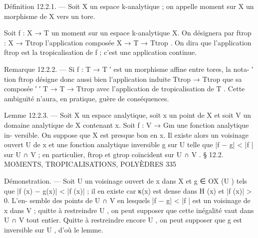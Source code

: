 \documentclass[
  10pt,
]{article}
\newenvironment{Shaded}{}{}
\newcommand{\NormalTok}[1]{#1}
\begin{document}
\begin{Shaded}
\begin{Highlighting}[]
\NormalTok{Définition 12.2.1. — Soit X un espace k{-}analytique ; on appelle moment sur X un}
\NormalTok{morphisme de X vers un tore.}

\NormalTok{   Soit f : X → T un moment sur un espace k{-}analytique X. On désignera par ftrop : X →}
\NormalTok{Ttrop l’application composée X → T → Ttrop . On dira que l’application ftrop est la}
\NormalTok{tropicalisation de f ; c’est une application continue.}

\NormalTok{Remarque 12.2.2. — Si f : T → T ′ est un morphisme affine entre tores, la nota{-}}
\NormalTok{                                                                  ′}
\NormalTok{tion ftrop désigne donc aussi bien l’application induite Ttrop → Ttrop que sa composée}
\NormalTok{        ′     ′}
\NormalTok{T → T → Ttrop avec l’application de tropicalisation de T . Cette ambiguïté n’aura, en}
\NormalTok{pratique, guère de conséquences.}

\NormalTok{Lemme 12.2.3. — Soit X un espace analytique, soit x un point de X et soit V un}
\NormalTok{domaine analytique de X contenant x. Soit f : V → Gm une fonction analytique in{-}}
\NormalTok{versible. On suppose que X est presque bon en x. Il existe alors un voisinage ouvert U}
\NormalTok{de x et une fonction analytique inversible g sur U telle que |f − g| \textless{} |f | sur U ∩ V ; en}
\NormalTok{particulier, ftrop et gtrop coïncident sur U ∩ V .}
\NormalTok{                      § 12.2. MOMENTS, TROPICALISATIONS, POLYÈDRES                         335}

\NormalTok{Démonstration. — Soit U un voisinage ouvert de x dans X et g ∈ OX (U ) tels que}
\NormalTok{|f (x) − g(x)| \textless{} |f (x)| ; il en existe car κ(x) est dense dans H (x) et |f (x)| \textgreater{} 0. L’en{-}}
\NormalTok{semble des points de U ∩ V en lesquels |f − g| \textless{} |f | est un voisinage de x dans V ; quitte}
\NormalTok{à restreindre U , on peut supposer que cette inégalité vaut dans U ∩ V tout entier. Quitte}
\NormalTok{à restreindre encore U , on peut supposer que g est inversible sur U , d’où le lemme.}


\end{Highlighting}
\end{Shaded}
\end{document}
